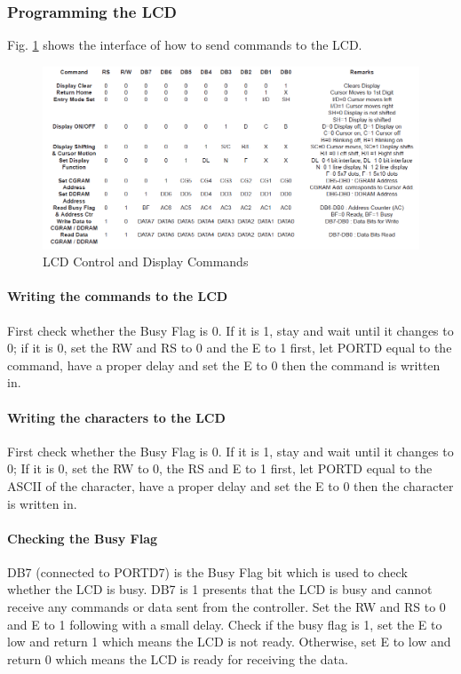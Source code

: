 \documentclass[]{report}
\begin{document}
\subsubsection{Programming the LCD}
Fig. \ref{fig:LCDControlandDisplaycommands} shows the interface of how to send commands to the LCD.

\begin{figure}
\centering
\includegraphics[width=0.7\linewidth]{"../Diagrams/LCD Control and Display commands"}
\caption{LCD Control and Display Commands}
\label{fig:LCDControlandDisplaycommands}
\end{figure}

\paragraph{Writing the commands to the LCD}
First check whether the Busy Flag is 0.  If it is 1, stay and wait until it changes to 0; if it is 0, set the RW and RS to 0 and the E to 1 first, let PORTD equal to the command, have a proper delay and set the E to 0 then the command is written in.

\paragraph{Writing the characters to the LCD}
First check whether the Busy Flag is 0. If it is 1, stay and wait until it changes to 0; If it is 0, set the RW to 0, the RS and E to 1 first, let PORTD equal to the ASCII of the character, have a proper delay and set the E to 0 then the character is written in.

\paragraph{Checking the Busy Flag}
DB7 (connected to PORTD7) is the Busy Flag bit which is used to check whether the LCD is busy. DB7 is 1 presents that the LCD is busy and cannot receive any commands or data sent from the controller. \newline
Set the RW and RS to 0 and E to 1 following with a small delay. Check if the busy flag is 1, set the E to low and return 1 which means the LCD is not ready. Otherwise, set E to low and return 0 which means the LCD is ready for receiving the data.
\end{document}
